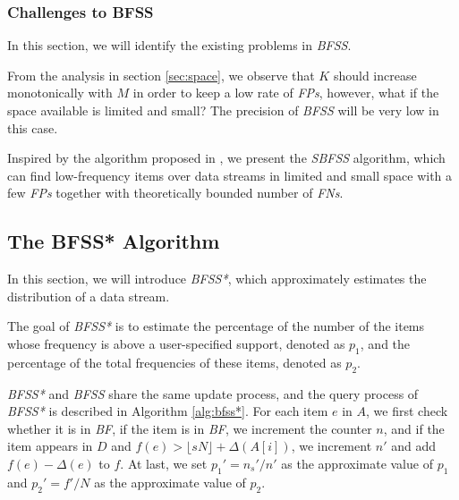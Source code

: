 \documentclass[conference]{IEEEtran}
\begin{document}
\subsubsection{\textbf{Challenges to BFSS}}
In this section, we will identify the existing problems in \emph{BFSS}.\par
From the analysis in section \ref{sec:space}, we observe that $K$ should increase monotonically with $M$ in order to keep a low rate of \emph{FPs}, however, what if the space available is limited and small? The precision of \emph{BFSS} will be very low in this case.\par
Inspired by the algorithm proposed in \cite{IEEEexample:sbf}, we present the \emph{SBFSS} algorithm, which can find low-frequency items over data streams in limited and small space with a few \emph{FPs} together with theoretically bounded number of \emph{FNs}.\par

\subsection{The BFSS* Algorithm}
In this section, we will introduce \emph{BFSS*}, which approximately estimates the distribution of a data stream.\par
The goal of \emph{BFSS*} is to estimate the percentage of the number of the items whose frequency is above a user-specified support, denoted as $p_1$, and the percentage of the total frequencies of these items, denoted as $p_2$.\par 
\emph{BFSS*} and \emph{BFSS} share the same update process, and the query process of \emph{BFSS*} is described in Algorithm \ref{alg:bfss*}. For each item $e$ in $A$, we first check whether it is in \emph{BF}, if the item is in \emph{BF}, we increment the counter $n$, and if the item appears in $D$ and $f(e)>\lfloor sN\rfloor+\Delta(A[i])$, we increment $n'$ and add $f(e)-\Delta(e)$ to $f$. At last, we set $p_1'=n_s'/n'$ as the approximate value of $p_1$ and $p_2'=f'/N$ as the approximate value of $p_2$.
\end{document}

